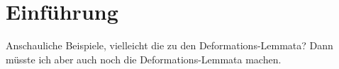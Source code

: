 \chapter{Einführung}

Anschauliche Beispiele, vielleicht die zu den Deformations-Lemmata? Dann müsste
ich aber auch noch die Deformations-Lemmata machen.
